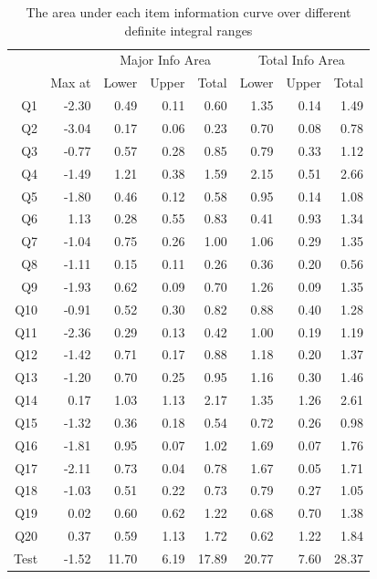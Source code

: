 \documentclass[a4paper]{report}
\begin{document}
\begin{table}[H]
  \centering
  \begin{tabular}{rr|rrr|rrr}
    \hline
    & & \multicolumn{3}{c|}{Major Info Area} & \multicolumn{3}{c}{Total Info Area} \\
   & Max at & Lower & Upper & Total & Lower & Upper & Total \\ 
   \hline
   Q1 & -2.30 & 0.49 & 0.11 & 0.60 & 1.35 & 0.14 & 1.49 \\ 
     Q2 & -3.04 & 0.17 & 0.06 & 0.23 & 0.70 & 0.08 & 0.78 \\ 
     Q3 & -0.77 & 0.57 & 0.28 & 0.85 & 0.79 & 0.33 & 1.12 \\ 
     Q4 & -1.49 & 1.21 & 0.38 & 1.59 & 2.15 & 0.51 & 2.66 \\ 
     Q5 & -1.80 & 0.46 & 0.12 & 0.58 & 0.95 & 0.14 & 1.08 \\ 
     Q6 & 1.13 & 0.28 & 0.55 & 0.83 & 0.41 & 0.93 & 1.34 \\ 
     Q7 & -1.04 & 0.75 & 0.26 & 1.00 & 1.06 & 0.29 & 1.35 \\ 
     Q8 & -1.11 & 0.15 & 0.11 & 0.26 & 0.36 & 0.20 & 0.56 \\ 
     Q9 & -1.93 & 0.62 & 0.09 & 0.70 & 1.26 & 0.09 & 1.35 \\ 
     Q10 & -0.91 & 0.52 & 0.30 & 0.82 & 0.88 & 0.40 & 1.28 \\ 
     Q11 & -2.36 & 0.29 & 0.13 & 0.42 & 1.00 & 0.19 & 1.19 \\ 
     Q12 & -1.42 & 0.71 & 0.17 & 0.88 & 1.18 & 0.20 & 1.37 \\ 
     Q13 & -1.20 & 0.70 & 0.25 & 0.95 & 1.16 & 0.30 & 1.46 \\ 
     Q14 & 0.17 & 1.03 & 1.13 & 2.17 & 1.35 & 1.26 & 2.61 \\ 
     Q15 & -1.32 & 0.36 & 0.18 & 0.54 & 0.72 & 0.26 & 0.98 \\ 
     Q16 & -1.81 & 0.95 & 0.07 & 1.02 & 1.69 & 0.07 & 1.76 \\ 
     Q17 & -2.11 & 0.73 & 0.04 & 0.78 & 1.67 & 0.05 & 1.71 \\ 
     Q18 & -1.03 & 0.51 & 0.22 & 0.73 & 0.79 & 0.27 & 1.05 \\ 
     Q19 & 0.02 & 0.60 & 0.62 & 1.22 & 0.68 & 0.70 & 1.38 \\ 
     Q20 & 0.37 & 0.59 & 1.13 & 1.72 & 0.62 & 1.22 & 1.84 \\ 
      \hline
    Test & -1.52 & 11.70 & 6.19 & 17.89 & 20.77 & 7.60 & 28.37 \\ 
     \hline
  \end{tabular}
  \caption{\label{tab:IRT_pre17_summaryiif}The area under each item information curve over different definite integral ranges}
\end{table}
\end{document}
